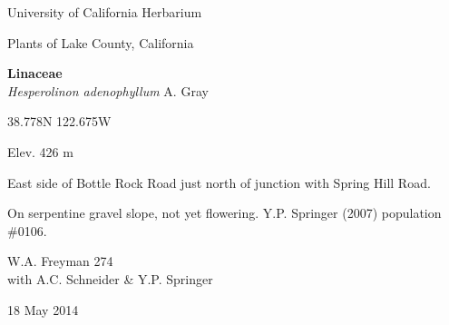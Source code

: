 \documentclass[letterpaper,10pt]{article}
\begin{document}
\begin{minipage}[t]{0.40\textwidth}

\begin{center}
University of California Herbarium \\
\begin{large}
Plants of Lake County, California \\
\end{large}
\vspace{\baselineskip}
\textbf{Linaceae} \\
\textit{Hesperolinon adenophyllum} A. Gray\\
\end{center}

\begin{footnotesize}

\begin{multicols}{2}
38.778\textdegree N 122.675\textdegree W
\columnbreak
\begin{flushright}
Elev. 426 m
\end{flushright}
\end{multicols}

East side of Bottle Rock Road just north of junction with Spring Hill Road.
\vspace{\baselineskip}

On serpentine gravel slope, not yet flowering. Y.P. Springer (2007) population \#0106.

\begin{multicols}{2}
W.A. Freyman 274 \\
with A.C. Schneider \& Y.P. Springer
\columnbreak
\begin{flushright}
18 May 2014
\end{flushright}
\end{multicols}

\end{footnotesize}

\end{minipage}

\vspace{2cm}
%
%

%
%
\end{document}

